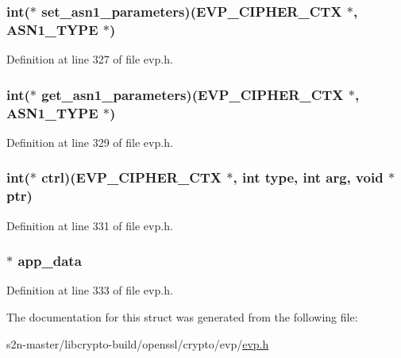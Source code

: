 \subsubsection[{\texorpdfstring{set\+\_\+asn1\+\_\+parameters}{set_asn1_parameters}}]{\setlength{\rightskip}{0pt plus 5cm}int($\ast$ set\+\_\+asn1\+\_\+parameters)({\bf E\+V\+P\+\_\+\+C\+I\+P\+H\+E\+R\+\_\+\+C\+TX} $\ast$, {\bf A\+S\+N1\+\_\+\+T\+Y\+PE} $\ast$)}\hypertarget{structevp__cipher__st_a2f3b51b9c07a375d8407505a639dee6d}{}\label{structevp__cipher__st_a2f3b51b9c07a375d8407505a639dee6d}


Definition at line 327 of file evp.\+h.

\subsubsection[{\texorpdfstring{get\+\_\+asn1\+\_\+parameters}{get_asn1_parameters}}]{\setlength{\rightskip}{0pt plus 5cm}int($\ast$ get\+\_\+asn1\+\_\+parameters)({\bf E\+V\+P\+\_\+\+C\+I\+P\+H\+E\+R\+\_\+\+C\+TX} $\ast$, {\bf A\+S\+N1\+\_\+\+T\+Y\+PE} $\ast$)}\hypertarget{structevp__cipher__st_a7bad788d28a1739af860d7877847f835}{}\label{structevp__cipher__st_a7bad788d28a1739af860d7877847f835}


Definition at line 329 of file evp.\+h.

\subsubsection[{\texorpdfstring{ctrl}{ctrl}}]{\setlength{\rightskip}{0pt plus 5cm}int($\ast$ ctrl)({\bf E\+V\+P\+\_\+\+C\+I\+P\+H\+E\+R\+\_\+\+C\+TX} $\ast$, int {\bf type}, int arg, {\bf void} $\ast$ptr)}\hypertarget{structevp__cipher__st_ab3ec1f933922b2d87b5474190f8e899d}{}\label{structevp__cipher__st_ab3ec1f933922b2d87b5474190f8e899d}


Definition at line 331 of file evp.\+h.

\subsubsection[{\texorpdfstring{app\+\_\+data}{app_data}}]{ $\ast$ app\+\_\+data}\hypertarget{structevp__cipher__st_a2d755a5df39e3da5ae2a0630fbe24c41}{}\label{structevp__cipher__st_a2d755a5df39e3da5ae2a0630fbe24c41}


Definition at line 333 of file evp.\+h.



The documentation for this struct was generated from the following file\+:\begin{DoxyCompactItemize}
\item 
s2n-\/master/libcrypto-\/build/openssl/crypto/evp/\hyperlink{crypto_2evp_2evp_8h}{evp.\+h}\end{DoxyCompactItemize}
